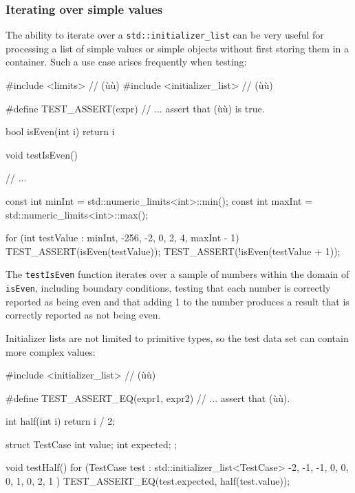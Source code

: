 {{\subsubsection[Iterating over simple values]{Iterating over simple values}\label{iterating-over-simple-values}

The ability to iterate over a \lstinline!std::initializer_list! can be
very useful for processing a list of simple values or simple objects
without first storing them in a container. Such a use case arises
frequently when testing:

\begin{emcppslisting}
#include <limits>            // (ù{}ù)
#include <initializer_list>  // (ù{}ù)

#define TEST_ASSERT(expr)  // ... assert that (ù{}ù) is true.

bool isEven(int i)
{
    return i %
}

void testIsEven()
{
    // ...

    const int minInt = std::numeric_limits<int>::min();
    const int maxInt = std::numeric_limits<int>::max();

    for (int testValue : {minInt, -256, -2, 0, 2, 4, maxInt - 1})
    {
        TEST_ASSERT(isEven(testValue));
        TEST_ASSERT(!isEven(testValue + 1));
    }
}
\end{emcppslisting}
    

\noindent The \lstinline!testIsEven! function iterates over a sample of numbers
within the domain of \lstinline!isEven!, including boundary conditions,
testing that each number is correctly reported as being even and that
adding 1 to the number produces a result that is correctly reported as
not being even.

Initializer lists are not limited to primitive types, so the test data
set can contain more complex values:

\begin{emcppslisting}
#include <initializer_list>  // (ù{}ù)

#define TEST_ASSERT_EQ(expr1, expr2)  // ... assert that (ù{}ù).

int half(int i)
{
    return i / 2;
}

struct TestCase
{
    int value;
    int expected;
};

void testHalf()
{
    for (TestCase test : std::initializer_list<TestCase>{
        {-2, -1}, {-1, 0}, {0, 0}, {1, 0}, {2, 1}
    })
    {
        TEST_ASSERT_EQ(test.expected, half(test.value));
    }
}
\end{emcppslisting}
    

}}
